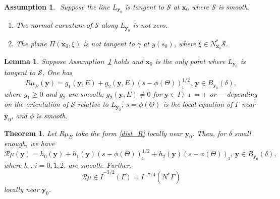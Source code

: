 \documentclass[10pt,a4paper]{amsart}
\newtheorem{assumption}{Assumption}
\newtheorem{lemma}{Lemma}
\newtheorem{theorem}{Theorem}
\newcommand{\CR}{\mathcal R}
\newcommand{\be}{\begin{equation}}
\newcommand{\ee}{\end{equation}}
\newcommand{\ga}{\gamma}
\newcommand{\s}{\mathcal S}
\newcommand{\vx}{\mathbf{x}}
\newcommand{\vy}{\mathbf{y}}
\begin{document}
\begin{assumption}\label{ass:sngl}$ $
Suppose the line $L_{\vy_0}$ is tangent to $\s$ at $\vx_0$ where $\s$ is smooth.
\begin{enumerate}[label=(\arabic*)]
\item\label{sng curv} The normal curvature of $\s$ along $L_{\vy_0}$ is not zero. 
\item\label{sng transv} The plane $\Pi(\vx_0,\xi)$ is not tangent to $\ga$ at $y(s_0)$, where $\xi\in N_{\vx_0}^*\s$.
\end{enumerate}
\end{assumption}

\begin{lemma}\label{lem:sing-ty} Suppose Assumption~\ref{ass:sngl} holds and $\vx_0$ is the only point where $L_{\vy_0}$ is tangent to $\s$. One has 
\be
\label{dist_R}
R\mu_E(\vy) =  g_1(\vy,E) + g_2(\vy,E)(s - \phi(\Theta))^{1/2}_\imath ,\ \vy\in B_{\vy_0}(\delta),
\ee
where $g_1\geq 0$ and $g_2$ are smooth; $g_2(\vy,E) \neq 0$ for $\vy\in\Gamma$; $\imath = +$ or $-$ depending on the orientation of $\s$ relative to $L_{\vy_0}$; $s = \phi(\Theta)$ is the local equation of $\Gamma$ near $\vy_0$, and $\phi$ is smooth.  
\end{lemma}

\begin{theorem}
\label{log_sing}
Let $R\mu_E$ take the form \eqref{dist_R} locally near $\vy_0$. Then, for $\delta$ small enough, we have
\be
\label{sqrt_sing}
\mathcal{R}\mu(\vy) = h_0(\vy) + h_1(\vy) (s - \phi(\Theta))^{1/2}_\imath + h_2(\vy) (s - \phi(\Theta))_\imath,\ \vy\in B_{\vy_0}(\delta),
\ee
where $h_i$, $i=0,1,2$, are smooth. Further,
\be\label{Rmu distr}
\CR\mu \in \dot{I}^{-3/2}(\Gamma)=I^{-7/4}(N^*\Gamma)
\ee
locally near $\vy_0$.
\end{theorem}
\end{document}
